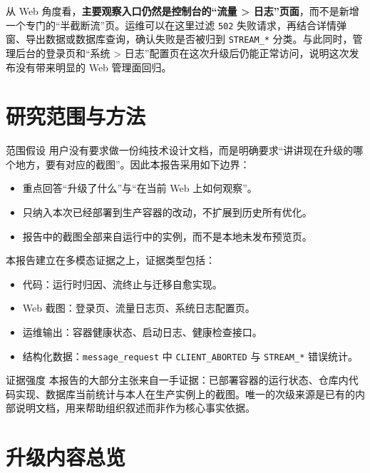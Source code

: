 \documentclass[a4paper]{article}
\begin{document}
从 Web 角度看，\textbf{主要观察入口仍然是控制台的“流量 > 日志”页面}，而不是新增一个专门的“半截断流”页。运维可以在这里过滤 \texttt{502} 失败请求，再结合详情弹窗、导出数据或数据库查询，确认失败是否被归到 \texttt{STREAM\_*} 分类。与此同时，管理后台的登录页和“系统 > 日志”配置页在这次升级后仍能正常访问，说明这次发布没有带来明显的 Web 管理面回归。

\section{研究范围与方法}

\begin{methodbox}{范围假设}
用户没有要求做一份纯技术设计文档，而是明确要求“讲讲现在升级的哪个地方，要有对应的截图”。因此本报告采用如下边界：
\begin{itemize}
\item 重点回答“升级了什么”与“在当前 Web 上如何观察”。
\item 只纳入本次已经部署到生产容器的改动，不扩展到历史所有优化。
\item 报告中的截图全部来自运行中的实例，而不是本地未发布预览页。
\end{itemize}
\end{methodbox}

本报告建立在多模态证据之上，证据类型包括：
\begin{itemize}
\item 代码：运行时归因、流终止与迁移自愈实现。
\item Web 截图：登录页、流量日志页、系统日志配置页。
\item 运维输出：容器健康状态、启动日志、健康检查接口。
\item 结构化数据：\texttt{message\_request} 中 \texttt{CLIENT\_ABORTED} 与 \texttt{STREAM\_*} 错误统计。
\end{itemize}

\begin{evidencebox}{证据强度}
本报告的大部分主张来自一手证据：已部署容器的运行状态、仓库内代码实现、数据库当前统计与本人在生产实例上的截图。唯一的次级来源是已有的内部说明文档，用来帮助组织叙述而非作为核心事实依据。
\end{evidencebox}

\section{升级内容总览}
\end{document}
